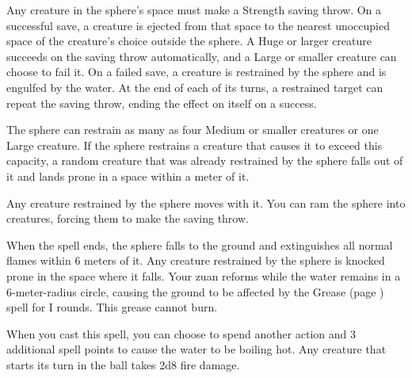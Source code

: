     Any creature in the sphere's space must make a Strength saving throw.
    On a successful save, a creature is ejected from that space to the nearest unoccupied space of the creature's choice outside the sphere.
    A Huge or larger creature succeeds on the saving throw automatically, and a Large or smaller creature can choose to fail it.
    On a failed save, a creature is restrained by the sphere and is engulfed by the water.
    At the end of each of its turns, a restrained target can repeat the saving throw, ending the effect on itself on a success.

    The sphere can restrain as many as four Medium or smaller creatures or one Large creature.
    If the sphere restrains a creature that causes it to exceed this capacity, a random creature that was already restrained by the sphere falls out of it and lands prone in a space within a meter of it.

    Any creature restrained by the sphere moves with it.
    You can ram the sphere into creatures, forcing them to make the saving throw.

    When the spell ends, the sphere falls to the ground and extinguishes all normal flames within 6 meters of it.
    Any creature restrained by the sphere is knocked prone in the space where it falls.
    Your zuan reforms while the water remains in a 6-meter-radius circle, causing the ground to be affected by the Grease (page \pageref{spell::grease}) spell for I rounds.
    This grease cannot burn.

    When you cast this spell, you can choose to spend another action and 3 additional spell points to cause the water to be boiling hot.
    Any creature that starts its turn in the ball takes 2d8 fire damage.

\newpage
